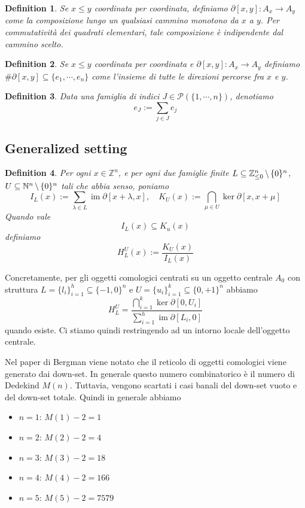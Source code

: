 \documentclass[a4paper]{article}
\DeclareMathOperator{\im}{im}
\newtheorem{definition}{Definition}[section]
\begin{document}
\begin{definition}
    Se \(x\leq y\) coordinata per coordinata, definiamo \(\partial[x,y] \colon A_x \to A_y\) come la composizione lungo
    un qualsiasi cammino monotono da \(x\) a \(y\).
    Per commutatività dei quadrati elementari, tale composizione è indipendente dal cammino scelto.
\end{definition}

\begin{definition}
    Se \(x\leq y\) coordinata per coordinata e \(\partial[x,y] \colon A_x \to A_y\)
    definiamo \(\#\partial[x,y] \subseteq \{e_1, \cdots, e_n\}\) come
    l'insieme di tutte le direzioni percorse fra \(x\) e \(y\).
\end{definition}

\begin{definition}
    Data una famiglia di indici \(J \in \mathcal P(\{1, \cdots, n\})\), denotiamo
    \[
        e_J := \sum_{j \in J} e_j
    \]
\end{definition}

\subsection{Generalized setting}

\begin{definition}
    Per ogni \(x \in \mathbb{Z}^n\), e per ogni due famiglie finite \(L \subseteq {\mathbb{Z}}_{\leq 0}^n \,\backslash\, \{0\}^n\), \(U \subseteq \mathbb{N}^n \,\backslash\, \{0\}^n\)
    tali che abbia senso, poniamo
    \[
        I_L(x) := \sum_{\lambda \in L} \im \partial[x + \lambda, x], \quad
        K_U(x) := \bigcap_{\mu \in U} \ker \partial[x, x+\mu]
    \]
    Quando vale \[
        I_L(x) \subseteq K_u(x)
    \]
    definiamo
    \[
        H_L^U(x) := \frac{K_U(x)}{I_L(x)}
    \]
\end{definition}

Concretamente, per gli oggetti comologici centrati su un oggetto centrale \(A_0\)
con struttura \(L = \{l_i\}_{i=1}^h \subseteq \{-1,0\}^n\)
e \(U = \{u_i\}_{i=1}^k \subseteq \{0,+1\}^n\) abbiamo
\[
    H_L^U = \frac{
        \displaystyle\bigcap_{i=1}^k \ker \partial[0,U_i]
    }{
        \displaystyle\sum_{i=1}^h \im \partial[L_i,0]
    }
\]
quando esiste.
Ci stiamo quindi restringendo ad un intorno locale dell'oggetto centrale.

Nel paper di Bergman \cite{bergman2012diagramchasing} viene notato che il reticolo di oggetti comologici viene generato
dai down-set. In generale questo numero combinatorico è il numero di Dedekind \(M(n)\).
Tuttavia, vengono scartati i casi banali del down-set vuoto e del down-set totale. Quindi in generale abbiamo
\begin{itemize}
    \item \(n=1\): \(M(1)-2 = 1\)
    \item \(n=2\): \(M(2)-2 = 4\)
    \item \(n=3\): \(M(3)-2 = 18\)
    \item \(n=4\): \(M(4)-2 = 166\)
    \item \(n=5\): \(M(5)-2 = 7579\)
\end{itemize}
\end{document}
